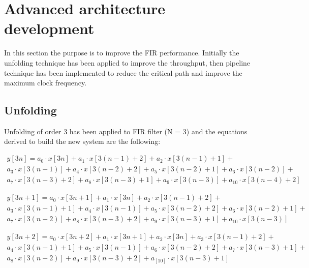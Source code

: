 %
\chapter{Advanced architecture development}
\label{cha3}

In this section the purpose is to improve the FIR performance. Initially the unfolding 
technique has been applied to improve the throughput, then pipeline technique has 
been implemented to reduce the critical path and improve the maximum clock frequency.

\section{Unfolding}

Unfolding of order 3 has been applied to FIR filter (N = 3) and the equations derived
to build the new system are the following:

\begin{equation}
\begin{split}
    y[3n] = a_0 \cdot x[3n] + a_1 \cdot x[3(n-1) + 2] + a_2 \cdot x[3(n-1) + 1] + \\
    a_3 \cdot x[3(n-1)] + a_4 \cdot x[3(n-2) + 2] + a_5 \cdot x[3(n-2) + 1] + a_6 \cdot x[3(n-2)] +  \\
    a_7 \cdot x[3(n-3) + 2] + a_8 \cdot x[3(n-3) + 1] + a_9 \cdot x[3(n-3)] + a_{10} \cdot x[3(n-4) + 2]
\end{split}
\end{equation}

\begin{equation}
\begin{split}
    y[3n + 1] = a_0 \cdot x[3n + 1] + a_1 \cdot x[3n] + a_2 \cdot x[3(n-1) + 2] + \\
    a_3 \cdot x[3(n-1) + 1] + a_4 \cdot x[3(n-1)] + a_5 \cdot x[3(n-2) + 2] + a_6 \cdot x[3(n-2)+1] +  \\
    a_7 \cdot x[3(n-2)] + a_8 \cdot x[3(n-3)+2] + a_9 \cdot x[3(n-3) + 1] + a_{10} \cdot x[3(n-3)]
\end{split}
\end{equation}

\begin{equation}
\begin{split}
    y[3n + 2] = a_0 \cdot x[3n + 2] + a_1 \cdot x[3n + 1] + a_2 \cdot x[3n] + a_3 \cdot x[3(n-1) + 2] +\\
    a_4 \cdot x[3(n-1) + 1] + a_5 \cdot x[3(n-1)] + a_6 \cdot x[3(n-2) + 2] +  a_7 \cdot x[3(n-3) + 1] +\\
    a_8 \cdot x[3(n-2)] + a_9 \cdot x[3(n-3) + 2] + a_[10] \cdot x[3(n-3) + 1]
\end{split}
\end{equation}

